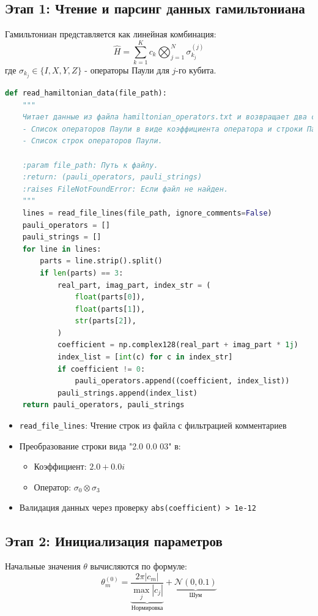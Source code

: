 \documentclass[a4paper]{report}
\begin{document}
\subsection{Этап 1: Чтение и парсинг данных гамильтониана}
Гамильтониан представляется как линейная комбинация:
\begin{equation}
\hat{H} = \sum_{k=1}^K c_k \bigotimes_{j=1}^N \sigma_{k_j}^{(j)}
\end{equation}
где $\sigma_{k_j} \in \{I, X, Y, Z\}$ - операторы Паули для $j$-го кубита.
\begin{lstlisting}[language=Python]
def read_hamiltonian_data(file_path):
    """
    Читает данные из файла hamiltonian_operators.txt и возвращает два списка:
    - Список операторов Паули в виде коэффициента оператора и строки Паули.
    - Список строк операторов Паули.

    :param file_path: Путь к файлу.
    :return: (pauli_operators, pauli_strings)
    :raises FileNotFoundError: Если файл не найден.
    """
    lines = read_file_lines(file_path, ignore_comments=False)
    pauli_operators = []
    pauli_strings = []
    for line in lines:
        parts = line.strip().split()
        if len(parts) == 3:
            real_part, imag_part, index_str = (
                float(parts[0]),
                float(parts[1]),
                str(parts[2]),
            )
            coefficient = np.complex128(real_part + imag_part * 1j)
            index_list = [int(c) for c in index_str]
            if coefficient != 0:
                pauli_operators.append((coefficient, index_list))
            pauli_strings.append(index_list)
    return pauli_operators, pauli_strings
\end{lstlisting}
\begin{itemize}
\item \texttt{read\_file\_lines}: Чтение строк из файла с фильтрацией комментариев
\item Преобразование строки вида "2.0 0.0 03" в:
  \begin{itemize}
  \item Коэффициент: $2.0 + 0.0i$
  \item Оператор: $\sigma_0 \otimes \sigma_3$
  \end{itemize}
\item Валидация данных через проверку \texttt{abs(coefficient) > 1e-12}
\end{itemize}

\subsection{Этап 2: Инициализация параметров}
Начальные значения $\theta$ вычисляются по формуле:
\begin{equation}
\theta_m^{(0)} = \underbrace{\frac{2\pi|c_m|}{\max_j|c_j|}}_{\text{Нормировка}} + \underbrace{\mathcal{N}(0, 0.1)}_{\text{Шум}}
\end{equation}
\end{document}
